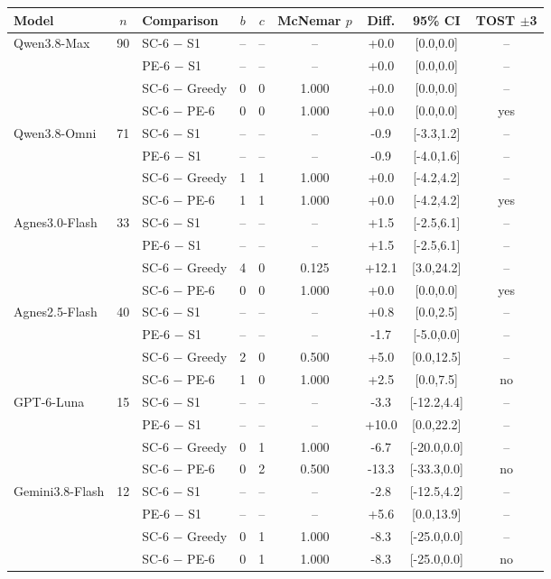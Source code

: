 \scriptsize
\begin{tabular*}{\columnwidth}{@{\extracolsep{\fill}} l c l c c c c c c}
\toprule
Model & $n$ & Comparison & $b$ & $c$ & McNemar $p$ & Diff. & 95\% CI & TOST $\pm$3 \\
\midrule
Qwen3.8-Max & 90 & SC-6 $-$ S1 & -- & -- & -- & +0.0 & [0.0,0.0] & -- \\
 &  & PE-6 $-$ S1 & -- & -- & -- & +0.0 & [0.0,0.0] & -- \\
 &  & SC-6 $-$ Greedy & 0 & 0 & 1.000 & +0.0 & [0.0,0.0] & -- \\
 &  & SC-6 $-$ PE-6 & 0 & 0 & 1.000 & +0.0 & [0.0,0.0] & yes \\
\addlinespace
Qwen3.8-Omni & 71 & SC-6 $-$ S1 & -- & -- & -- & -0.9 & [-3.3,1.2] & -- \\
 &  & PE-6 $-$ S1 & -- & -- & -- & -0.9 & [-4.0,1.6] & -- \\
 &  & SC-6 $-$ Greedy & 1 & 1 & 1.000 & +0.0 & [-4.2,4.2] & -- \\
 &  & SC-6 $-$ PE-6 & 1 & 1 & 1.000 & +0.0 & [-4.2,4.2] & yes \\
\addlinespace
Agnes3.0-Flash & 33 & SC-6 $-$ S1 & -- & -- & -- & +1.5 & [-2.5,6.1] & -- \\
 &  & PE-6 $-$ S1 & -- & -- & -- & +1.5 & [-2.5,6.1] & -- \\
 &  & SC-6 $-$ Greedy & 4 & 0 & 0.125 & +12.1 & [3.0,24.2] & -- \\
 &  & SC-6 $-$ PE-6 & 0 & 0 & 1.000 & +0.0 & [0.0,0.0] & yes \\
\addlinespace
Agnes2.5-Flash & 40 & SC-6 $-$ S1 & -- & -- & -- & +0.8 & [0.0,2.5] & -- \\
 &  & PE-6 $-$ S1 & -- & -- & -- & -1.7 & [-5.0,0.0] & -- \\
 &  & SC-6 $-$ Greedy & 2 & 0 & 0.500 & +5.0 & [0.0,12.5] & -- \\
 &  & SC-6 $-$ PE-6 & 1 & 0 & 1.000 & +2.5 & [0.0,7.5] & no \\
\addlinespace
GPT-6-Luna & 15 & SC-6 $-$ S1 & -- & -- & -- & -3.3 & [-12.2,4.4] & -- \\
 &  & PE-6 $-$ S1 & -- & -- & -- & +10.0 & [0.0,22.2] & -- \\
 &  & SC-6 $-$ Greedy & 0 & 1 & 1.000 & -6.7 & [-20.0,0.0] & -- \\
 &  & SC-6 $-$ PE-6 & 0 & 2 & 0.500 & -13.3 & [-33.3,0.0] & no \\
\addlinespace
Gemini3.8-Flash & 12 & SC-6 $-$ S1 & -- & -- & -- & -2.8 & [-12.5,4.2] & -- \\
 &  & PE-6 $-$ S1 & -- & -- & -- & +5.6 & [0.0,13.9] & -- \\
 &  & SC-6 $-$ Greedy & 0 & 1 & 1.000 & -8.3 & [-25.0,0.0] & -- \\
 &  & SC-6 $-$ PE-6 & 0 & 1 & 1.000 & -8.3 & [-25.0,0.0] & no \\
\bottomrule
\end{tabular*}